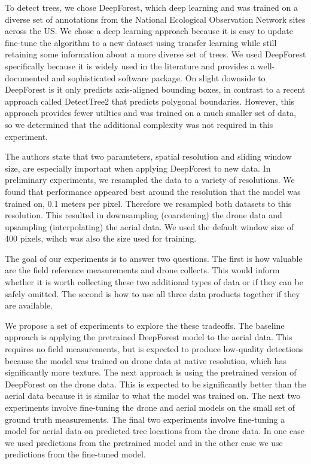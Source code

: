 To detect trees, we chose DeepForest\cite{Weinstein2020DeepForest:Delineation}, which deep learning and was trained on a diverse set of annotations from the National Ecological Observation Network sites \cite{Keller2008ANetwork} across the US. We chose a deep learning approach because it is easy to update fine-tune the algorithm to a new dataset using transfer learning while still retaining some information about a more diverse set of trees.
We used DeepForest specifically because it is widely used in the literature and provides a well-documented and sophisticated software package. On slight downside to DeepForest is it only predicts axis-aligned bounding boxes, in contrast to a recent approach called DetectTree2 \cite{DetectTree2} that predicts polygonal boundaries. However, this approach provides fewer utilties and was trained on a much smaller set of data, so we determined that the additional complexity was not required in this experiment. 

The authors state that two paramteters, spatial resolution and sliding window size, are especially important when applying DeepForest to new data. In preliminary experiments, we resampled the data to a variety of resolutions. We found that performance appeared best around the resolution that the model was trained on, 0.1 meters per pixel. Therefore we resampled both datasets to this resolution. This resulted in downsampling (coarstening) the drone data and upsampling (interpolating) the aerial data. We used the default window size of 400 pixels, wihch was also the size used for training.

The goal of our experiments is to answer two questions. The first is how valuable are the field reference measurements and drone collects. This would inform whether it is worth collecting these two additional types of data or if they can be safely omitted. The second is how to use all three data products together if they are available.

We propose a set of experiments to explore the these tradeoffs. The baseline approach is applying the pretrained DeepForest model to the aerial data. This requires no field measurements, but is expected to produce low-quality detections because the model was trained on drone data at native resolution, which has significantly more texture. The next approach is using the pretrained version of DeepForest on the drone data. This is expected to be significantly better than the aerial data because it is similar to what the model was trained on. The next two experiments involve fine-tuning the drone and aerial models on the small set of ground truth measurements. The final two experiments involve fine-tuning a model for aerial data on predicted tree locations from the drone data. In one case we used predictions from the pretrained model and in the other case we use predictions from the fine-tuned model. 

